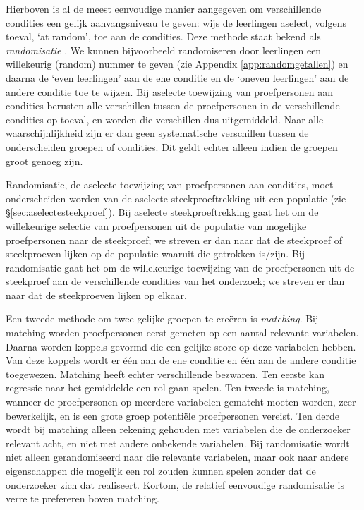 \documentclass[
]{book}
\begin{document}
Hierboven is al de meest eenvoudige manier aangegeven om verschillende
condities een gelijk aanvangsniveau te geven: wijs de leerlingen
aselect, volgens toeval, `at random', toe aan de condities. Deze methode
staat bekend als \emph{randomisatie} \citep[p.294 ff]{SCC02}. We kunnen bijvoorbeeld
randomiseren door leerlingen een willekeurig (random) nummer te geven
(zie
Appendix \ref{app:randomgetallen}) en daarna de `even leerlingen' aan de
ene conditie en de `oneven leerlingen' aan de andere conditie toe te
wijzen. Bij aselecte toewijzing van proefpersonen aan condities berusten
alle verschillen tussen de proefpersonen in de verschillende condities
op toeval, en worden die verschillen dus uitgemiddeld. Naar alle
waarschijnlijkheid zijn er dan geen systematische verschillen tussen de
onderscheiden groepen of condities. Dit geldt echter alleen indien de
groepen groot genoeg zijn.

Randomisatie, de aselecte toewijzing van proefpersonen aan condities,
moet onderscheiden worden van de aselecte steekproeftrekking uit een
populatie (zie
§\ref{sec:aselectesteekproef}). Bij aselecte
steekproeftrekking gaat het om de willekeurige selectie van
proefpersonen uit de populatie van mogelijke proefpersonen naar de
steekproef; we streven er dan naar dat de steekproef of steekproeven
lijken op de populatie waaruit die getrokken is/zijn. Bij randomisatie
gaat het om de willekeurige toewijzing van de proefpersonen uit de
steekproef aan de verschillende condities van het onderzoek; we streven
er dan naar dat de steekproeven lijken op elkaar.

Een tweede methode om twee gelijke groepen te creëren is \emph{matching}. Bij
matching worden proefpersonen eerst gemeten op een aantal relevante
variabelen. Daarna worden koppels gevormd die een gelijke score op deze
variabelen hebben. Van deze koppels wordt er één aan de ene conditie en
één aan de andere conditie toegewezen. Matching heeft echter
verschillende bezwaren. Ten eerste kan regressie naar het gemiddelde een
rol gaan spelen. Ten tweede is matching, wanneer de proefpersonen op
meerdere variabelen gematcht moeten worden, zeer bewerkelijk, en is een
grote groep potentiële proefpersonen vereist. Ten derde wordt bij
matching alleen rekening gehouden met variabelen die de onderzoeker
relevant acht, en niet met andere onbekende variabelen. Bij randomisatie
wordt niet alleen gerandomiseerd naar die relevante variabelen, maar ook
naar andere eigenschappen die mogelijk een rol zouden kunnen spelen
zonder dat de onderzoeker zich dat realiseert. Kortom, de relatief
eenvoudige randomisatie is verre te prefereren boven matching.
\end{document}
